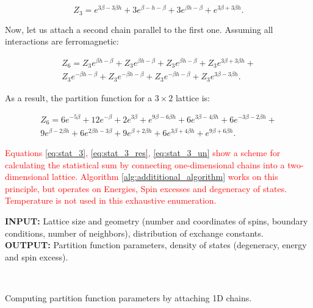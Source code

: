 \documentclass[preprint,12pt]{elsarticle}
\begin{document}
	\begin{equation}
		Z_3 = e^{3\beta - 3\beta h} + 3e^{\beta - h - \beta} + 3e^{\beta h - \beta} + e^{3\beta + 3\beta h}.
		\label{eq:stat_3}
	\end{equation}
	
	Now, let us attach a second chain parallel to the first one. Assuming all interactions are ferromagnetic:
	
	\begin{equation}
		\label{eq:stat_3_un}
		\begin{alignedat}{2}
			Z_6 = Z_3 e^{\beta h-\beta} + Z_3 e^{\beta h-\beta} + Z_3 e^{\beta h-\beta} + Z_3 e^{3 \beta +3 \beta h} + \\
			Z_3 e^{-\beta h-\beta} + Z_3 e^{-\beta h-\beta} + Z_3 e^{-\beta h-\beta} + Z_3 e^{3 \beta -3 \beta h}.
		\end{alignedat}
	\end{equation}
	
	As a result, the partition function for a $3 \times 2$ lattice is:
	
	\begin{equation}
		\label{eq:stat_3_res}
		\begin{alignedat}{2}
			Z_6 = 6 e^{-5 \beta } + 12 e^{-\beta } + 2 e^{3 \beta } + e^{9 \beta -6 \beta  h} + 6 e^{3 \beta -4 \beta  h} + 6 e^{-3 \beta -2 \beta  h} + \\
			9 e^{\beta -2 \beta  h} + 6 e^{2 \beta  h-3 \beta } + 9 e^{\beta +2 \beta  h} + 6 e^{3 \beta +4 \beta  h} + e^{9 \beta +6 \beta  h}.
		\end{alignedat}
	\end{equation}
	
	\textcolor{red}{Equations \ref{eq:stat_3}, \ref{eq:stat_3_res}, \ref{eq:stat_3_un} show a scheme for calculating the statistical sum by connecting one-dimensional chains into a two-dimensional lattice. Algorithm \ref{alg:addititional_algorithm} \cite{trukhin2024glaurung} works on this principle, but operates on Energies, Spin excesses and degeneracy of states. Temperature is not used in this exhaustive enumeration.}
	
	\begin{algorithm}[H]
		\textbf{INPUT:} Lattice size and geometry (number and coordinates of spins, boundary conditions, number of neighbors), distribution of exchange constants.\\
		\textbf{OUTPUT:} Partition function parameters, density of states (degeneracy, energy and spin excess).
		\begin{algorithmic}
			{
				{
				}
				\ENDFOR \\
			}
			\ENDFOR
		\end{algorithmic}
		\caption{Computing partition function parameters by attaching 1D chains.}
		\label{alg:addititional_algorithm}
	\end{algorithm}
	
\end{document}
